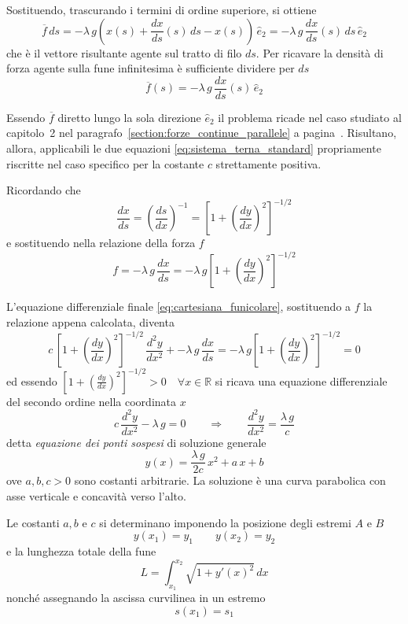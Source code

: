 Sostituendo, trascurando i termini di ordine superiore, si ottiene
\[
 \overline{f}\,ds = -\lambda\,g\left(x(s) + \dfrac{dx}{ds}(s)\,ds - x(s)\right)\,\hat{e}_2 = -\lambda\,g\,\dfrac{dx}{ds}(s)\,ds\,\hat{e}_2 
\]
che è il vettore risultante agente sul tratto di filo $ds$. Per ricavare la densità di forza agente sulla fune infinitesima è sufficiente dividere per $ds$
\[
 \overline{f}(s) = -\lambda\,g\,\dfrac{dx}{ds}(s)\,\hat{e}_2
\]

Essendo $\overline{f}$ diretto lungo la sola direzione $\hat{e}_2$ il problema ricade nel caso studiato al capitolo~2 nel paragrafo~\ref{section:forze_continue_parallele} a pagina~\pageref{section:forze_continue_parallele}. 
Risultano, allora, applicabili le due equazioni \eqref{eq:sistema_terna_standard} propriamente riscritte nel caso specifico per la costante $c$ strettamente positiva. 

Ricordando che 
\[
 \dfrac{dx}{ds} = \left(\dfrac{ds}{dx}\right)^{-1} = \left[1+\left(\dfrac{dy}{dx}\right)^2\right]^{-1/2}
\]
e sostituendo nella relazione della forza $f$
\[
 f = -\lambda\,g\,\dfrac{dx}{ds} = -\lambda\,g\left[1+\left(\dfrac{dy}{dx}\right)^2\right]^{-1/2}
\]

L'equazione differenziale finale \eqref{eq:cartesiana_funicolare}, sostituendo a $f$ la relazione appena calcolata, diventa
\begin{equation*}
 c\,\left[1+ \left(\dfrac{dy}{dx}\right)^2\right]^{-1/2}\,\dfrac{d^2 y}{dx^2} + -\lambda\,g\,\dfrac{dx}{ds} = -\lambda\,g\left[1+\left(\dfrac{dy}{dx}\right)^2\right]^{-1/2} = 0
\end{equation*}
ed essendo $\left[1+\left(\frac{dy}{dx}\right)^2\right]^{-1/2}>0\quad\forall x\in\mathbb{R}$ si ricava una equazione differenziale del secondo ordine nella coordinata $x$
\begin{equation}
 \label{eq:equazione_differenziale_ponte_sospeso}
 c\,\dfrac{d^2y}{dx^2} - \lambda\,g = 0\qquad \Longrightarrow\qquad \dfrac{d^2y}{dx^2} = \dfrac{\lambda\,g}{c}
\end{equation}
detta \emph{equazione dei ponti sospesi} di soluzione generale 
\[
 y(x) = \dfrac{\lambda\,g}{2 c}\,x^2 + a\,x+ b
\]
ove $a,b,c >0$ sono costanti arbitrarie. La soluzione è una curva parabolica con asse verticale e concavità verso l'alto.

Le costanti $a,b$ e $c$ si determinano imponendo la posizione degli estremi $A$ e $B$
\[
 y(x_1) = y_1 \qquad y(x_2)=y_2
\]
e la lunghezza totale della fune
\[
 L = \int_{x_1}^{x_2} \sqrt{1+y'(x)^2}\,dx
\]
nonché assegnando la ascissa curvilinea in un estremo
\[
 s(x_1) = s_1
\]

